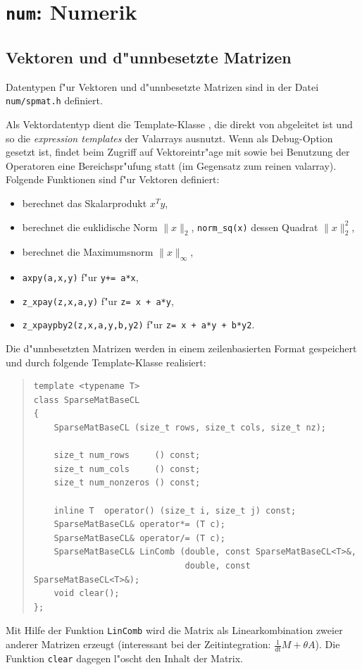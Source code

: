 \documentclass[11pt,a4paper]{article}
\newenvironment{Code}{\begin{quote}\scriptsize}{\end{quote}}
\begin{document}
\section{{\tt num}: Numerik}

\subsection{Vektoren und d"unnbesetzte Matrizen}

Datentypen f"ur Vektoren und d"unnbesetzte Matrizen sind in der Datei
\verb|num/spmat.h| definiert.

Als Vektordatentyp dient die Template-Klasse , die direkt
von  abgeleitet ist und so die \emph{expression templates}
der Valarrays ausnutzt. Wenn  als Debug-Option gesetzt ist,
findet beim Zugriff auf Vektoreintr"age mit \prg{[]} sowie bei Benutzung der
Operatoren \prg{+, -, =, +=, -=, *=, /=} eine Bereichspr"ufung statt (im Gegensatz zum reinen
valarray). Folgende Funktionen sind f"ur Vektoren definiert:
\begin{itemize}
  \item {} berechnet das Skalarprodukt $x^T y$,
  \item {} berechnet die euklidische Norm $\|x\|_2$, 
    \verb|norm_sq(x)| dessen Quadrat $\|x\|_2^2$,
  \item {} berechnet die Maximumsnorm $\|x\|_\infty$,
  \item \verb|axpy(a,x,y)| f"ur \verb|y+= a*x|,
  \item \verb|z_xpay(z,x,a,y)| f"ur \verb|z= x + a*y|,
  \item \verb|z_xpaypby2(z,x,a,y,b,y2)| f"ur \verb|z= x + a*y + b*y2|.
\end{itemize}

Die d"unnbesetzten Matrizen werden in einem zeilenbasierten Format gespeichert
und durch folgende Template-Klasse realisiert:

\begin{Code}
\begin{verbatim}
template <typename T>
class SparseMatBaseCL
{
    SparseMatBaseCL (size_t rows, size_t cols, size_t nz);

    size_t num_rows     () const;
    size_t num_cols     () const;
    size_t num_nonzeros () const;

    inline T  operator() (size_t i, size_t j) const;
    SparseMatBaseCL& operator*= (T c);
    SparseMatBaseCL& operator/= (T c);
    SparseMatBaseCL& LinComb (double, const SparseMatBaseCL<T>&,
                              double, const SparseMatBaseCL<T>&);
    void clear();
};
\end{verbatim}
\end{Code}
Mit Hilfe der Funktion \verb|LinComb| wird die Matrix als Linearkombination
zweier anderer Matrizen erzeugt (interessant bei der Zeitintegration: $\frac{1}{dt}M+\theta
A$). Die Funktion \verb|clear| dagegen l"oscht den Inhalt der Matrix.
\end{document}

